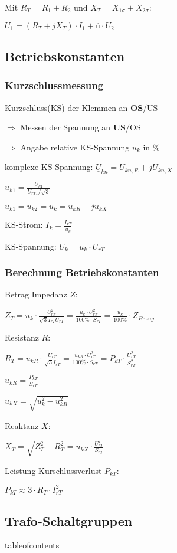 \documentclass[a4paper,11pt]{article}
\begin{document}
	Mit $R_T = R_1 + R_2$ und $X_T = X_{1\sigma} + X_{2\sigma}$:
	
	$U_1 = (R_T + jX_T) \cdot I_1 + \text{ü} \cdot U_2$

	\subsection{Betriebskonstanten}
	\subsubsection{Kurzschlussmessung}

	Kurzschluss(KS) der Klemmen an  \textbf{OS}/US
	
	$\Rightarrow$ Messen der Spannung an \textbf{US}/OS 
	
	$\Rightarrow$ Angabe relative KS-Spannung $u_{k}$ in $\%$

	komplexe KS-Spannung: $\underline{U}_{kn} = U_{kn,R} +jU_{kn,X}$

	$u_{k1} = \frac{U_{k1}}{U_{rT1}/ \sqrt{3}}$

	$u_{k1} = u_{k2} = u_{k} = u_{kR}+j u_{kX}$

	KS-Strom:
	$I_k = \frac{I_{rT}}{u_k}$

	KS-Spannung:
	$U_k = u_k \cdot U_{rT}$
	\subsubsection{Berechnung Betriebskonstanten}
	
	Betrag Impedanz $Z$:
	
	$Z_T = u_k \cdot \frac{U_{rT}^2}{\sqrt{3}I_{rT}U_{rT}} =\frac{u_k \cdot U_{rT}^2}{100 \% \cdot S_{rT}} = \frac{u_k}{100\%} \cdot Z_{Bezug}$

	Resistanz $R$:
	
	$R_T = u_{kR} \cdot \frac{U_{rT}}{\sqrt{3} I_{rT}} = \frac{u_{kR}\cdot U^2_{rT}}{100\% \cdot S_{rT}} = P_{kT} \cdot \frac{U_{rT}^2}{S_{rT}^2}$

	$u_{kR} = \frac{P_{kT}}{S_{rT}}$

	$u_{kX} = \sqrt{u^2_k - u^2_{kR}}$
	
	Reaktanz $X$:
	
	$X_T = \sqrt{Z^2_T - R^2_T} = u_{kX} \cdot \frac{U^2_{rT}}{S_{rT}}$
	
	Leistung Kurschlussverlust $P_{kT}$:
	
	$P_{kT} \approx 3\cdot R_T \cdot I^2_{rT}$
	
	\subsection{Trafo-Schaltgruppen}
	tableofcontents
\end{document}
